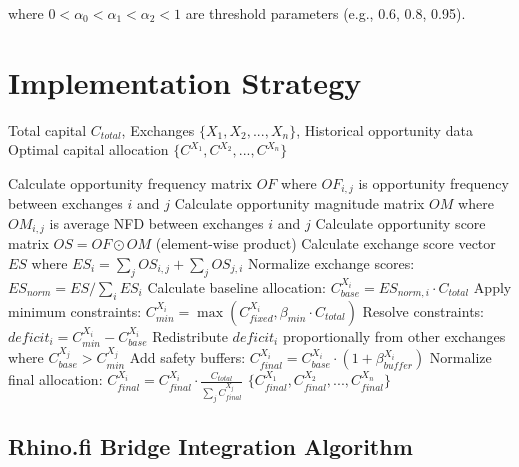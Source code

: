 \documentclass{article}
\begin{document}
where $0 < \alpha_0 < \alpha_1 < \alpha_2 < 1$ are threshold parameters (e.g., 0.6, 0.8, 0.95).

\section{Implementation Strategy}

\begin{algorithm}
\caption{API-Aware Capital Allocation Strategy}
\begin{algorithmic}[1]
\REQUIRE Total capital $C_{total}$, Exchanges $\{X_1, X_2, ..., X_n\}$, Historical opportunity data
\ENSURE Optimal capital allocation $\{C^{X_1}, C^{X_2}, ..., C^{X_n}\}$

\STATE Calculate opportunity frequency matrix $OF$ where $OF_{i,j}$ is opportunity frequency between exchanges $i$ and $j$
\STATE Calculate opportunity magnitude matrix $OM$ where $OM_{i,j}$ is average NFD between exchanges $i$ and $j$
\STATE Calculate opportunity score matrix $OS = OF \odot OM$ (element-wise product)
\STATE Calculate exchange score vector $ES$ where $ES_i = \sum_j OS_{i,j} + \sum_j OS_{j,i}$
\STATE Normalize exchange scores: $ES_{norm} = ES / \sum_i ES_i$
\STATE Calculate baseline allocation: $C_{base}^{X_i} = ES_{norm,i} \cdot C_{total}$
\STATE Apply minimum constraints: $C_{min}^{X_i} = \max(C_{fixed}^{X_i}, \beta_{min} \cdot C_{total})$
\STATE Resolve constraints:
    \STATE $deficit_i = C_{min}^{X_i} - C_{base}^{X_i}$
    \STATE Redistribute $deficit_i$ proportionally from other exchanges where $C_{base}^{X_j} > C_{min}^{X_j}$
\ENDFOR
\STATE Add safety buffers: $C_{final}^{X_i} = C_{base}^{X_i} \cdot (1 + \beta_{buffer}^{X_i})$
\STATE Normalize final allocation: $C_{final}^{X_i} = C_{final}^{X_i} \cdot \frac{C_{total}}{\sum_j C_{final}^{X_j}}$
\RETURN $\{C_{final}^{X_1}, C_{final}^{X_2}, ..., C_{final}^{X_n}\}$
\end{algorithmic}
\end{algorithm}

\subsection{Rhino.fi Bridge Integration Algorithm}
\end{document}
